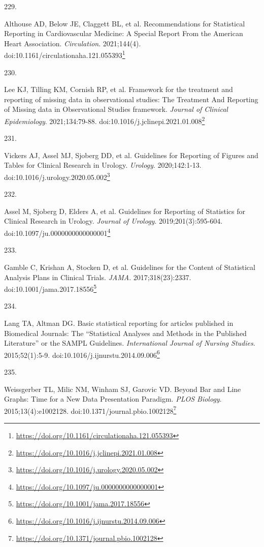 \documentclass[
  a4paper,
]{book}
\newlength{\cslhangindent}
\newlength{\csllabelwidth}
\newlength{\cslentryspacingunit} %
\newenvironment{CSLReferences}[2] %
 {%
  \setlength{\parindent}{0pt}
  \ifodd #1
  \let\oldpar\par
  \def\par{\hangindent=\cslhangindent\oldpar}
  \fi
  \setlength{\parskip}{#2\cslentryspacingunit}
 }%
 {}
\newcommand{\CSLLeftMargin}[1]{\parbox[t]{\csllabelwidth}{#1}}
\newcommand{\CSLRightInline}[1]{\parbox[t]{\linewidth - \csllabelwidth}{#1}\break}
\renewcommand{\href}[2]{#2\footnote{\url{#1}}}
\begin{document}
\begin{CSLReferences}{0}{0}
\leavevmode{}%
\CSLLeftMargin{229. }%
\CSLRightInline{Althouse AD, Below JE, Claggett BL, et al. Recommendations for Statistical Reporting in Cardiovascular Medicine: A Special Report From the American Heart Association. \emph{Circulation}. 2021;144(4). doi:\href{https://doi.org/10.1161/circulationaha.121.055393}{10.1161/circulationaha.121.055393}}

\leavevmode{}%
\CSLLeftMargin{230. }%
\CSLRightInline{Lee KJ, Tilling KM, Cornish RP, et al. Framework for the treatment and reporting of missing data in observational studies: The Treatment And Reporting of Missing data in Observational Studies framework. \emph{Journal of Clinical Epidemiology}. 2021;134:79-88. doi:\href{https://doi.org/10.1016/j.jclinepi.2021.01.008}{10.1016/j.jclinepi.2021.01.008}}

\leavevmode{}%
\CSLLeftMargin{231. }%
\CSLRightInline{Vickers AJ, Assel MJ, Sjoberg DD, et al. Guidelines for Reporting of Figures and Tables for Clinical Research in Urology. \emph{Urology}. 2020;142:1-13. doi:\href{https://doi.org/10.1016/j.urology.2020.05.002}{10.1016/j.urology.2020.05.002}}

\leavevmode{}%
\CSLLeftMargin{232. }%
\CSLRightInline{Assel M, Sjoberg D, Elders A, et al. Guidelines for Reporting of Statistics for Clinical Research in Urology. \emph{Journal of Urology}. 2019;201(3):595-604. doi:\href{https://doi.org/10.1097/ju.0000000000000001}{10.1097/ju.0000000000000001}}

\leavevmode{}%
\CSLLeftMargin{233. }%
\CSLRightInline{Gamble C, Krishan A, Stocken D, et al. Guidelines for the Content of Statistical Analysis Plans in Clinical Trials. \emph{JAMA}. 2017;318(23):2337. doi:\href{https://doi.org/10.1001/jama.2017.18556}{10.1001/jama.2017.18556}}

\leavevmode{}%
\CSLLeftMargin{234. }%
\CSLRightInline{Lang TA, Altman DG. Basic statistical reporting for articles published in Biomedical Journals: The {``}Statistical Analyses and Methods in the Published Literature{''} or the SAMPL Guidelines. \emph{International Journal of Nursing Studies}. 2015;52(1):5-9. doi:\href{https://doi.org/10.1016/j.ijnurstu.2014.09.006}{10.1016/j.ijnurstu.2014.09.006}}

\leavevmode{}%
\CSLLeftMargin{235. }%
\CSLRightInline{Weissgerber TL, Milic NM, Winham SJ, Garovic VD. Beyond Bar and Line Graphs: Time for a New Data Presentation Paradigm. \emph{PLOS Biology}. 2015;13(4):e1002128. doi:\href{https://doi.org/10.1371/journal.pbio.1002128}{10.1371/journal.pbio.1002128}}


\end{CSLReferences}
\end{document}
